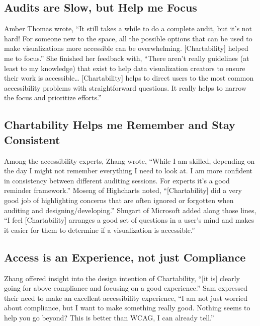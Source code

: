 \documentclass[12pt]{cmuthesis}
\begin{document}
\subsection{Audits are Slow, but Help me Focus}
Amber Thomas wrote, ``It still takes a while to do a complete audit, but it's not hard! For someone new to the space, all the possible options that can be used to make visualizations more accessible can be overwhelming. [Chartability] helped me to focus.'' She finished her feedback with, ``There aren't really guidelines (at least to my knowledge) that exist to help data visualization creators to ensure their work is accessible… [Chartability] helps to direct users to the most common accessibility problems with straightforward questions. It really helps to narrow the focus and prioritize efforts.'' 

\subsection{Chartability Helps me Remember and Stay Consistent}
Among the accessibility experts, Zhang wrote, ``While I am skilled, depending on the day I might not remember everything I need to look at. I am more confident in consistency between different auditing sessions. For experts it’s a good reminder framework.'' Moseng of Highcharts noted, ``[Chartability] did a very good job of highlighting concerns that are often ignored or forgotten when auditing and designing/developing.'' Shugart of Microsoft added along those lines, ``I feel [Chartability] arranges a good set of questions in a user’s mind and makes it easier for them to determine if a visualization is accessible.''

\subsection{Access is an Experience, not just Compliance}
Zhang offered insight into the design intention of Chartability, ``[it is] clearly going for above compliance and focusing on a good experience.'' Sam expressed their need to make an excellent accessibility experience, ``I am not just worried about compliance, but I want to make something really good. Nothing seems to help you go beyond? This is better than WCAG, I can already tell.''
\end{document}
